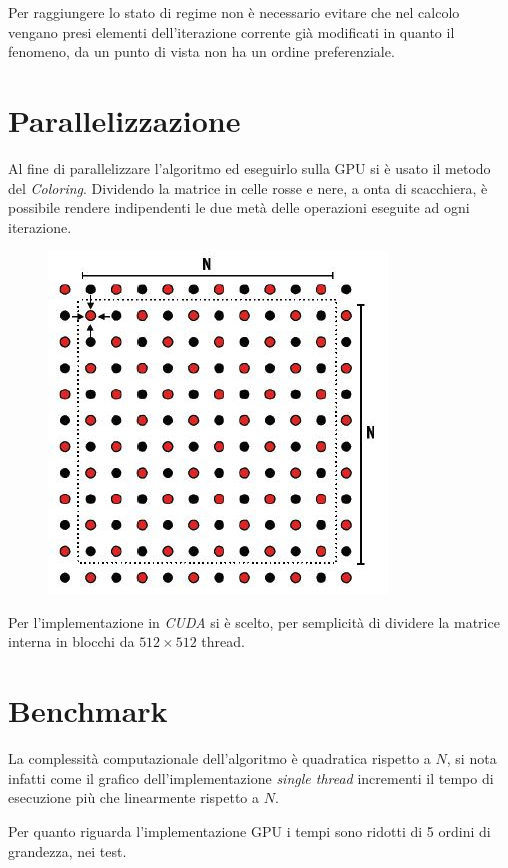 \documentclass[12pt]{article}
\begin{document}
Per raggiungere lo stato di regime non è necessario evitare che nel calcolo vengano presi elementi dell'iterazione corrente già modificati in quanto il fenomeno, da un punto di vista non ha un ordine preferenziale.

\section{Parallelizzazione}
Al fine di parallelizzare l'algoritmo ed eseguirlo sulla GPU si è usato il metodo del \emph{Coloring}. Dividendo la matrice in celle rosse e nere, a onta di scacchiera, è possibile rendere indipendenti le due metà delle operazioni eseguite ad ogni iterazione.

\begin{figure}[H]
\includegraphics{PDE_coloring.jpg}
\centering
\end{figure}

Per l'implementazione in \emph{CUDA} si è scelto, per semplicità di dividere la matrice interna in blocchi da $ 512 \times 512 $ thread.

\section{Benchmark}
La complessità computazionale dell'algoritmo è quadratica rispetto a $N$, si nota infatti come il grafico dell'implementazione \emph{single thread} incrementi il tempo di esecuzione più che linearmente rispetto a $N$.

Per quanto riguarda l'implementazione GPU i tempi sono ridotti di 5 ordini di grandezza, nei test.
\end{document}

